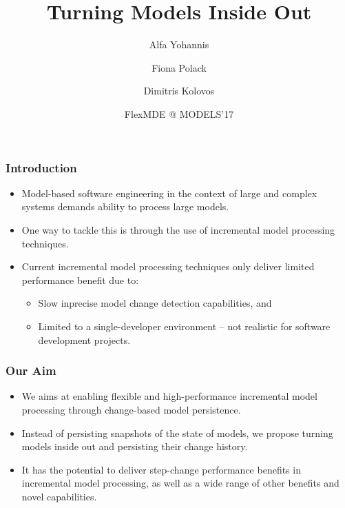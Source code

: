 \documentclass{beamer}
\begin{document}
    \title[Crisis] %
{Turning Models Inside Out}
\author[Author, Anders] %
{Alfa Yohannis\and Fiona Polack \and Dimitris Kolovos}
\date[18 September 2017]
{FlexMDE @ MODELS'17}
\subject{Computer Science}

\frame{\titlepage}

\begin{frame}
\frametitle{Introduction}
\begin{itemize}
    \item Model-based software engineering in the context of large and complex systems demands ability to process large models.
    \item One way to tackle this is through the use of incremental model processing techniques.
    \item Current incremental model processing techniques only deliver limited performance benefit due to:
    \begin{itemize}
        \item Slow inprecise model change detection capabilities, and
        \item Limited to a single-developer environment -- not realistic for software development projects.
    \end{itemize}    
\end{itemize}
\end{frame}
  
\begin{frame}
\frametitle{Our Aim}
\begin{itemize}
\item We aims at enabling flexible and high-performance incremental model processing through change-based model persistence.
\item Instead of persisting snapshots of the state of models, we propose turning models inside out and persisting their change history.
\item It has the potential to deliver step-change performance benefits in incremental model processing, as well as a wide range of other benefits and novel capabilities.
\end{itemize}  
\end{frame}
\end{document}
